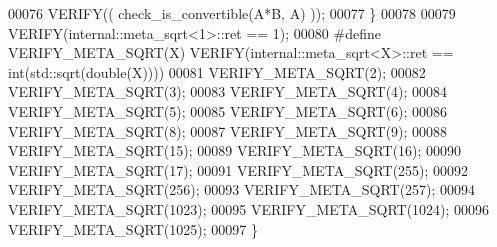 \begin{DoxyCode}
00076     VERIFY(( check\_is\_convertible(A*B, A) ));
00077   \}
00078   
00079   VERIFY(internal::meta\_sqrt<1>::ret == 1);
00080 \textcolor{preprocessor}{  #define VERIFY\_META\_SQRT(X) VERIFY(internal::meta\_sqrt<X>::ret == int(std::sqrt(double(X))))}
00081   VERIFY\_META\_SQRT(2);
00082   VERIFY\_META\_SQRT(3);
00083   VERIFY\_META\_SQRT(4);
00084   VERIFY\_META\_SQRT(5);
00085   VERIFY\_META\_SQRT(6);
00086   VERIFY\_META\_SQRT(8);
00087   VERIFY\_META\_SQRT(9);
00088   VERIFY\_META\_SQRT(15);
00089   VERIFY\_META\_SQRT(16);
00090   VERIFY\_META\_SQRT(17);
00091   VERIFY\_META\_SQRT(255);
00092   VERIFY\_META\_SQRT(256);
00093   VERIFY\_META\_SQRT(257);
00094   VERIFY\_META\_SQRT(1023);
00095   VERIFY\_META\_SQRT(1024);
00096   VERIFY\_META\_SQRT(1025);
00097 \}
\end{DoxyCode}

